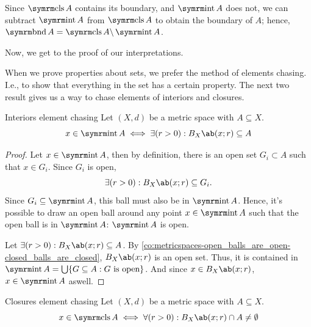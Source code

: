 Since \(\clos A\) contains its boundary, and \(\intr A\) does not, we can subtract \(\intr A\)
from \(\clos A\) to obtain the boundary of \(A\); hence, \(\bnd A = \clos A \smin \intr A\).

Now, we get to the proof of our interpretations.

When we prove properties about sets, we prefer the method of elements chasing. I.e.,
to show that everything in the set has a certain property. The next two result gives
us a way to chase elements of interiors and closures.

\begin{lemma}{Interiors element chasing}{}
  Let \((X, d)\) be a metric space with \(A \subseteq X\).
  \begin{equation}
    x \in \intr A \iff \exists (r > 0) : \oball{X}{x}{r} \subseteq A
  \end{equation}
\end{lemma}

\begin{proof}
  \forwarddir Let \(x \in \intr A\), then by definition, there is an open set
  \(G_i \subset A\) such that \(x \in G_i\). Since \(G_i\) is open,
  \begin{equation}
    \exists (r > 0) : \oball{X}{x}{r} \subseteq G_i.
  \end{equation}
  Since \(G_i \subseteq \intr A\), this ball must also be in \(\intr A\). Hence, it's
  possible to draw an open ball around any point \(x \in \intr A\) such that the open
  ball is in \(\intr A\): \(\intr A\) is open.

  \backwarddir Let \(\exists (r > 0) : \oball{X}{x}{r} \subseteq A\). By
  \cref{co:metricspaces-open_balls_are_open-closed_balls_are_closed}, \(\oball{X}{x}{r}\) is an
  open set. Thus, it is contained in \(\intr A = \bigcup \{G \subseteq A : G \textrm{ is open}\}\).
  And since \(x \in \oball{X}{x}{r}\), \(x \in \intr A\) aswell.
\end{proof}

\begin{lemma}{Closures element chasing}{}
  Let \((X, d)\) be a metric space with \(A \subseteq X\).
  \begin{equation}
    x \in \clos A \iff \forall (r > 0) : \oball{X}{x}{r} \cap A \neq \emptyset
  \end{equation}
\end{lemma}

